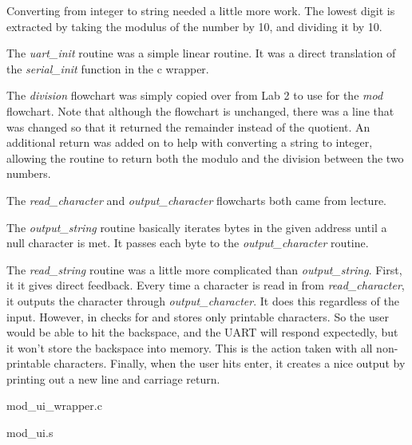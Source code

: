 \documentclass[letterpaper,10pt]{article}
\begin{document}
    Converting from integer to string needed a little more work. The lowest
    digit is extracted by taking the modulus of the number by 10, and dividing
    it by 10.

    

    The \textit{uart\_init} routine was a simple linear routine. It was a direct
    translation of the \textit{serial\_init} function in the c wrapper.
    

    The \textit{division} flowchart was simply copied over from Lab 2 to use
    for the \textit{mod} flowchart. Note that although the flowchart is
    unchanged, there was a line that was changed so that it returned the
    remainder instead of the quotient. An additional return was added on
    to help with converting a string to integer, allowing the routine to return
    both the modulo and the division between the two numbers.

    

    The \textit{read\_character} and \textit{output\_character} flowcharts both
    came from lecture.

    \begin{minipage}{0.5\linewidth}
        
    \end{minipage}%
    \begin{minipage}{0.5\linewidth}
        
    \end{minipage}

    The \textit{output\_string} routine basically iterates bytes in the given
    address until a null character is met. It passes each byte to the
    \textit{output\_character} routine.
    

    The \textit{read\_string} routine was a little more complicated than
    \textit{output\_string}. First, it it gives direct feedback. Every time a
    character is read in from \textit{read\_character}, it outputs the character
    through \textit{output\_character}. It does this regardless of the input.
    However, in checks for and stores only printable characters. So the user
    would be able to hit the backspace, and the UART will respond expectedly,
    but it won't store the backspace into memory. This is the action taken with
    all non-printable characters. Finally, when the user hits enter, it creates
    a nice output by printing out a new line and carriage return.
    

    mod\_ui\_wrapper.c
    

    \newpage

    mod\_ui.s
    
\end{document}
